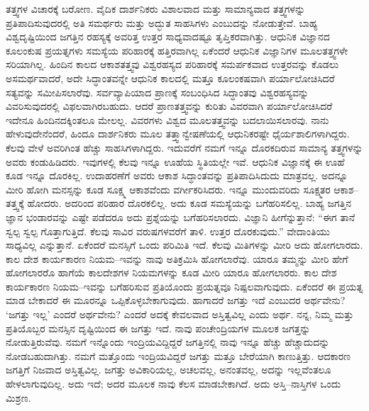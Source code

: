 ತತ್ತ್ವಗಳ ವಿಚಾರಕ್ಕೆ ಬರೋಣ. ವೈದಿಕ ದಾರ್ಶನಿಕರು ವಿಶಾಲವಾದ ಮತ್ತು ಸಾಮಾನ್ಯವಾದ ತತ್ತ್ವಗಳನ್ನು ಪ್ರತಿಪಾದಿಸುವುದರಲ್ಲಿ ಅತಿ ಸಮರ್ಥರು ಮತ್ತು ಅದ್ಭುತ ಸಾಹಸಿಗಳು ಎಂಬುದನ್ನು ನೋಡುತ್ತೇವೆ. ಬಾಹ್ಯ ವಿಶ್ವದೃಷ್ಟಿಯಿಂದ ಜಗತ್ತಿನ ರಹಸ್ಯಕ್ಕೆ ಅವರಿತ್ತ ಉತ್ತರ ಸಾಧ್ಯವಾದಷ್ಟೂ ತೃಪ್ತಿಕರವಾಗಿತ್ತು. ಆಧುನಿಕ ವಿಜ್ಞಾನದ ಕೂಲಂಕುಷ ಪ್ರಯತ್ನಗಳು ಸಮಸ್ಯೆಯ ಪರಿಹಾರಕ್ಕೆ ಹತ್ತಿರವಾಗಿಲ್ಲ ಏಕೆಂದರೆ ಆಧುನಿಕ ವಿಜ್ಞಾನಿಗಳ ಮೂಲತತ್ತ್ವಗಳೇ ಸರಿಯಾಗಿಲ್ಲ. ಹಿಂದಿನ ಕಾಲದ ಆಕಾಶತತ್ತ್ವವು ವಿಶ್ವರಹಸ್ಯದ ಪರಿಹಾರಕ್ಕೆ ಸಮರ್ಪಕವಾದ ಉತ್ತರವನ್ನು ಕೊಡಲು ಅಸಮರ್ಥವಾದರೆ, ಅದೇ ಸಿದ್ಧಾಂತವನ್ನೇ ಆಧುನಿಕ ಕಾಲದಲ್ಲಿ ಮತ್ತೂ ಕೂಲಂಕಷವಾಗಿ ಪರ್ಯಾಲೋಚಿಸಿದರೆ ಸತ್ಯವನ್ನು ಸಮೀಪಿಸಲಾರೆವು. ಸರ್ವವ್ಯಾಪಿಯಾದ ಪ್ರಾಣಕ್ಕೆ ಸಂಬಂಧಿಸಿದ ಸಿದ್ಧಾಂತವು ವಿಶ್ವರಹಸ್ಯವನ್ನು ವಿವರಿಸುವುದರಲ್ಲಿ ವಿಫಲವಾಗಿರಬಹುದು. ಆದರೆ ಪ್ರಾಣತತ್ತ್ವವನ್ನು ಕುರಿತು ವಿವರವಾಗಿ ಪರ್ಯಾಲೋಚಿಸಿದರೆ ಇದೇನೂ ಹಿಂದಿನದಕ್ಕಿಂತಲೂ ಮೇಲಲ್ಲ. ವಿವರಗಳು ವಿಶ್ವದ ಮೂಲತತ್ತ್ವವನ್ನು ಬದಲಾಯಿಸಲಾರವು. ನಾನು ಹೇಳುವುದೇನೆಂದರೆ, ಹಿಂದೂ ದಾರ್ಶನಿಕರು ಮೂಲ ತತ್ತ್ವಾನ್ವೇಷಣೆಯಲ್ಲಿ ಆಧುನಿಕರಷ್ಟೇ ಧೈರ್ಯಶಾಲಿಗಳಾಗಿದ್ದರು. ಕೆಲವು ವೇಳೆ ಅವರಿಗಿಂತ ಹೆಚ್ಚು ಸಾಹಸಿಗಳಾಗಿದ್ದರು. ಇದುವರೆಗೆ ನಮಗೆ ಇನ್ನೂ ದೊರಕದಿರುವ ಸಾಮಾನ್ಯ ತತ್ತ್ವಗಳನ್ನು ಅವರು ಕಂಡುಹಿಡಿದರು. ಇವುಗಳಲ್ಲಿ ಕೆಲವು ಇನ್ನೂ ಊಹೆಯ ಸ್ಥಿತಿಯಲ್ಲೇ ಇವೆ. ಆಧುನಿಕ ವಿಜ್ಞಾನಕ್ಕೆ ಈ ಊಹೆ ಕೂಡ ಇನ್ನೂ ದೊರಕಿಲ್ಲ. ಉದಾಹರಣೆಗೆ ಅವರು ಆಕಾಶ ಸಿದ್ಧಾಂತವನ್ನು ಪ್ರತಿಪಾದಿಸಿದುದು ಮಾತ್ರವಲ್ಲ. ಅದನ್ನೂ ಮೀರಿ ಹೋಗಿ ಮನಸ್ಸನ್ನು ಕೂಡ ಸೂಕ್ಷ್ಮ ಆಕಾಶವೆಂದು ವರ್ಗೀಕರಿಸಿದರು. ಇನ್ನೂ ಮುಂದುವರಿದು ಸೂಕ್ಷ್ಮತರ ಆಕಾಶ–ತತ್ತ್ವಕ್ಕೆ ಹೋದರು. ಅದರಿಂದ ಪರಿಹಾರ ದೊರಕಲಿಲ್ಲ. ಅದು ಕೂಡ ಸಮಸ್ಯೆಯನ್ನು ಬಗೆಹರಿಸಲಿಲ್ಲ. ಬಾಹ್ಯ ಜಗತ್ತಿನ ಜ್ಞಾನ ಭಂಡಾರವನ್ನು ಎಷ್ಟೇ ಪಡೆದರೂ ಅದು ಪ್ರಶ್ನೆಯನ್ನು ಬಗೆಹರಿಸಲಾರದು. ವಿಜ್ಞಾನಿ ಹೀಗೆನ್ನುತ್ತಾನೆ: “ಈಗ ತಾನೆ ಸ್ವಲ್ಪ ಸ್ವಲ್ಪ ಗೊತ್ತಾಗುತ್ತಿದೆ. ಕೆಲವು ಸಾವಿರ ವರುಷಗಳವರೆಗೆ ತಾಳಿ. ಉತ್ತರ ದೊರಕುವುದು.” ವೇದಾಂತಿಯು ಸಾಧ್ಯವಿಲ್ಲ ಎನ್ನುತ್ತಾನೆ. ಏಕೆಂದರೆ ಮನಸ್ಸಿಗೆ ಒಂದು ಪರಿಮಿತಿ ಇದೆ. ಕೆಲವು ಮಿತಿಗಳನ್ನು ಮೀರಿ ಅದು ಹೋಗಲಾರದು. ಕಾಲ ದೇಶ ಕಾರ್ಯಕಾರಣ ನಿಯಮ–ಇವನ್ನು ನಾವು ಅತಿಕ್ರಮಿಸಿ ಹೋಗಲಾರೆವು. ಯಾರೂ ತಮ್ಮನ್ನು ಮೀರಿ ಹೇಗೆ ಹೋಗಲಾರರೊ ಹಾಗೆಯೆ ಕಾಲದೇಶಗಳ ನಿಯಮಗಳನ್ನು ಕೂಡ ಮೀರಿ ಯಾರೂ ಹೋಗಲಾರರು. ಕಾಲ ದೇಶ ಕಾರ್ಯಕಾರಣ ನಿಯಮ–ಇವನ್ನು ಬಗೆಹರಿಸುವ ಪ್ರತಿಯೊಂದು ಪ್ರಯತ್ನವೂ ನಿಷ್ಪಲವಾಗುವುದು. ಏಕೆಂದರೆ ಈ ಪ್ರಯತ್ನ ಮಾಡ ಬೇಕಾದರೆ ಈ ಮೂರನ್ನೂ ಒಪ್ಪಿಕೊಳ್ಳಬೇಕಾಗುವುದು. ಹಾಗಾದರೆ ಜಗತ್ತು ಇದೆ ಎಂಬುದರ ಅರ್ಥವೇನು? ‘ಜಗತ್ತು ಇಲ್ಲ’ ಎಂದರೆ ಅರ್ಥವೇನು? ಎಂದರೆ ಅದಕ್ಕೆ ಕೇವಲವಾದ ಅಸ್ತಿತ್ವವಿಲ್ಲ ಎಂದು ಅರ್ಥ. ನನ್ನ, ನಿಮ್ಮ ಮತ್ತು ಪ್ರತಿಯೊಬ್ಬರ ಮನಸ್ಸಿನ ದೃಷ್ಟಿಯಿಂದ ಈ ಜಗತ್ತು ಇದೆ. ನಾವು ಪಂಚೇಂದ್ರಿಯಗಳ ಮೂಲಕ ಜಗತ್ತನ್ನು ನೋಡುತ್ತಿರುವೆವು. ನಮಗೆ ಇನ್ನೊಂದು ಇಂದ್ರಿಯವಿದ್ದಿದ್ದರೆ ಜಗತ್ತಿನಲ್ಲಿ ನಾವು ಇನ್ನೂ ಹೆಚ್ಚು ಹೆಚ್ಚಾದುದನ್ನು ನೋಡಬಹುದಾಗಿತ್ತು. ನಮಗೆ ಮತ್ತೊಂದು ಇಂದ್ರಿಯವಿದ್ದರೆ ಜಗತ್ತು ಮತ್ತೂ ಬೇರೆಯಾಗಿ ಕಾಣುತ್ತಿತ್ತು. ಆದಕಾರಣ ಜಗತ್ತಿಗೆ ನಿಜವಾದ ಅಸ್ತಿತ್ವವಿಲ್ಲ. ಜಗತ್ತು ಅವಿಕಾರಿಯಲ್ಲ, ಅಚಲವಲ್ಲ, ಅನಂತವಲ್ಲ, ಅದನ್ನು ಇಲ್ಲವೆಂತಲೂ ಹೇಳಲಾಗುವುದಿಲ್ಲ. ಅದು ಇದೆ; ಅದರ ಮೂಲಕ ನಾವು ಕೆಲಸ ಮಾಡಬೇಕಾಗಿದೆ. ಅದು ಅಸ್ತಿ–ನಾಸ್ತಿಗಳ ಒಂದು ಮಿಶ್ರಣ.

